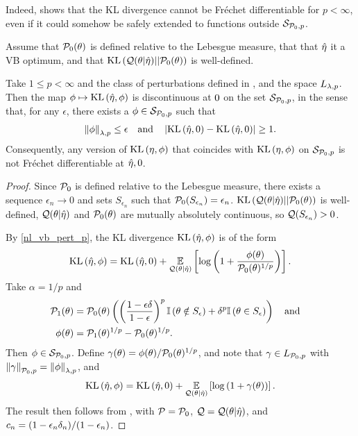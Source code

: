 Indeed,  shows that the KL divergence cannot be
Fr{\'e}chet differentiable for $p < \infty$, even if it could somehow be safely
extended to functions outside $\mathcal{S}_{\mathcal{P}_{0},p}$.

%
\begin{cor}
%
Assume that $\mathcal{P}_{0}(\theta)$ is defined relative to the Lebesgue measure, that
that $\hat\eta$ it a VB optimum, and that $\mathrm{KL}\left(\mathcal{Q}(\theta \vert \hat\eta) ||
\mathcal{P}_{0}(\theta)\right)$ is well-defined.

Take $1 \le p < \infty$ and the class of perturbations defined in
, and the space ${L_{\lambda, p}}$.  Then the map $\phi
\mapsto \mathrm{KL}\left(\hat\eta, \phi\right)$ is discontinuous at $0$ on the set $\mathcal{S}_{\mathcal{P}_{0},p}$,
in the sense that, for any $\epsilon$, there exists a $\phi \in \mathcal{S}_{\mathcal{P}_{0},p}$ such
that
%
\begin{align*}
%
\norm{\phi}_{\lambda,p} \le \epsilon \mathand
\abs{\KL{\etaopt, \phiz} - \KL{\etaopt, \phiz}} \ge 1.
%
\end{align*}
%
Consequently, any version of $\mathrm{KL}\left(\eta, \phi\right)$ that coincides with $\mathrm{KL}\left(\eta,
\phi\right)$ on $\mathcal{S}_{\mathcal{P}_{0},p}$ is not Fr{\'e}chet differentiable at $\hat\eta, 0$.
%
\begin{proof}
%
Since $\mathcal{P}_{0}$ is defined relative to the Lebesgue measure, there exists a
sequence $\epsilon_n \rightarrow 0$ and sets $S_{\epsilon_n}$ such that
$\mathcal{P}_{0}(S_{\epsilon_n}) = \epsilon_n$.  $\mathrm{KL}\left(\mathcal{Q}(\theta \vert \hat\eta) ||
\mathcal{P}_{0}(\theta)\right)$ is well-defined, $\mathcal{Q}(\theta \vert \hat\eta)$ and
$\mathcal{P}_{0}(\theta)$ are mutually absolutely continuous, so $\mathcal{Q}(S_{\epsilon_n}) >
0$.

By \eqref{nl_vb_pert_p}, the KL divergence $\mathrm{KL}\left(\hat\eta, \phi\right)$ is of the form
%
\begin{align*}
%
\KL{\etaopt, \phi} = \KL{\etaopt, \phiz} +
\expect{\q(\theta \vert \etaopt)}{
    \log\left(1 + \frac{\phi(\theta)}{\pbase(\theta)^{1/p}}\right)
}.
%
\end{align*}
%
Take $\alpha = 1/p$ and
%
\begin{align*}
%
\palt(\theta) ={}&
    \pbase(\theta)\left(
        \left( \frac{1 - \epsilon\delta}{1 - \epsilon}\right)^{p}
        \ind{\theta \notin S_{\epsilon}} +
        \delta^{p} \ind{\theta \in S_{\epsilon}}
    \right) \mathand
\\
\phi(\theta) ={}& \palt(\theta)^{1/p} - \pbase(\theta)^{1/p}.
%
\end{align*}
%
Then $\phi \in \mathcal{S}_{\mathcal{P}_{0},p}$.   Define $\gamma(\theta) = \phi(\theta) /
\mathcal{P}_{0}(\theta)^{1/p}$, and note that $\gamma \in {L_{\mathcal{P}_{0}, p}}$ with
$\left\Vert\gamma\right\Vert_{\mathcal{P}_{0}, p} = \left\Vert\phi\right\Vert_{\lambda, p}$, and
%
\begin{align*}
%
\KL{\etaopt, \phi} = \KL{\etaopt, \phiz} +
\expect{\q(\theta \vert \etaopt)}{\log\left(1 + \gamma(\theta)\right)}.
%
\end{align*}
%
The result then follows from , with $\mathcal{P} =
\mathcal{P}_{0}$,  $\mathcal{Q} = \mathcal{Q}(\theta \vert \hat\eta)$, and $c_n = (1 - \epsilon_n \delta_n) /
(1 - \epsilon_n)$.
%
\end{proof}
%
\end{cor}
